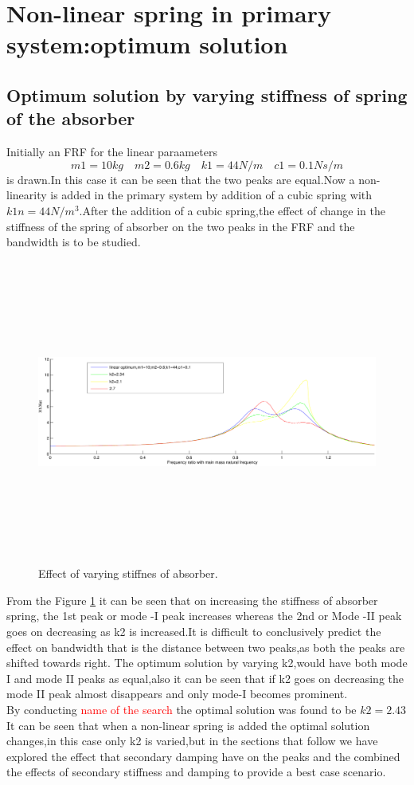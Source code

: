 \section{Non-linear spring in primary system:optimum solution}
\subsection{Optimum solution by varying stiffness of spring of the absorber } 
Initially an FRF for the linear paraameters $$ m1=10 kg\quad m2=0.6kg\quad k1=44 N/m\quad c1=0.1 Ns/m $$ is drawn.In this case it can be seen that the two peaks are equal.Now a non-linearity is added in the primary system by addition of a cubic spring with $k1n=44 N/m^3$.After the addition of a cubic spring,the effect of change in the stiffness of the spring of absorber on the two peaks in the FRF and the bandwidth is to be studied.
\begin{figure}[h!]
\includegraphics[width=16cm,height=10cm]{"figures/nonlinearity_primaryymass_3_effect of secondaryspring"}
  \caption{Effect of varying stiffnes of absorber.}
  \label{fig:varying stiffnes of absorber}
  \end{figure}
From the Figure \ref{fig:varying stiffnes of absorber} it can be seen that on increasing the stiffness of absorber spring, the 1st peak or mode -I peak increases whereas the 2nd or Mode -II peak goes on decreasing as k2 is increased.It is difficult to conclusively predict the effect on bandwidth that is the distance between two peaks,as both the peaks are shifted towards right.
The optimum solution by varying k2,would have both mode I and mode II peaks as equal,also it can be seen that if k2 goes on decreasing the mode II peak almost disappears and only mode-I becomes prominent.\\
By conducting \textcolor{red}{name of the search} the optimal solution was found to be $k2=2.43$ It can be seen that when a non-linear spring is added the optimal solution changes,in this case only k2 is varied,but in the sections that follow we have explored the effect that secondary damping have on the peaks and the combined the effects of secondary stiffness and damping to provide a best case scenario.\\

